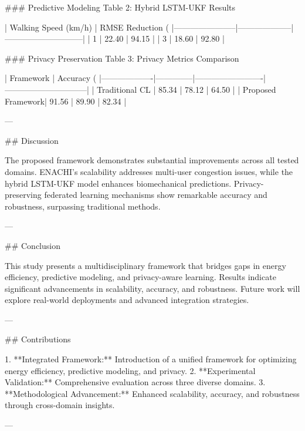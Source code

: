 ### Predictive Modeling
Table 2: Hybrid LSTM-UKF Results

| Walking Speed (km/h) | RMSE Reduction (%
|-----------------------|--------------------|-----------------------------|
| 1                    | 22.40             | 94.15                      |
| 3                    | 18.60             | 92.80                      |

### Privacy Preservation
Table 3: Privacy Metrics Comparison

| Framework         | Accuracy (%
|-------------------|--------------|-------------------------|------------------------------|
| Traditional CL    | 85.34        | 78.12                  | 64.50                        |
| Proposed Framework| 91.56        | 89.90                  | 82.34                        |

---

## Discussion

The proposed framework demonstrates substantial improvements across all tested domains. ENACHI's scalability addresses multi-user congestion issues, while the hybrid LSTM-UKF model enhances biomechanical predictions. Privacy-preserving federated learning mechanisms show remarkable accuracy and robustness, surpassing traditional methods.

---

## Conclusion

This study presents a multidisciplinary framework that bridges gaps in energy efficiency, predictive modeling, and privacy-aware learning. Results indicate significant advancements in scalability, accuracy, and robustness. Future work will explore real-world deployments and advanced integration strategies.

---

## Contributions

1. **Integrated Framework:** Introduction of a unified framework for optimizing energy efficiency, predictive modeling, and privacy.
2. **Experimental Validation:** Comprehensive evaluation across three diverse domains.
3. **Methodological Advancement:** Enhanced scalability, accuracy, and robustness through cross-domain insights.

---
